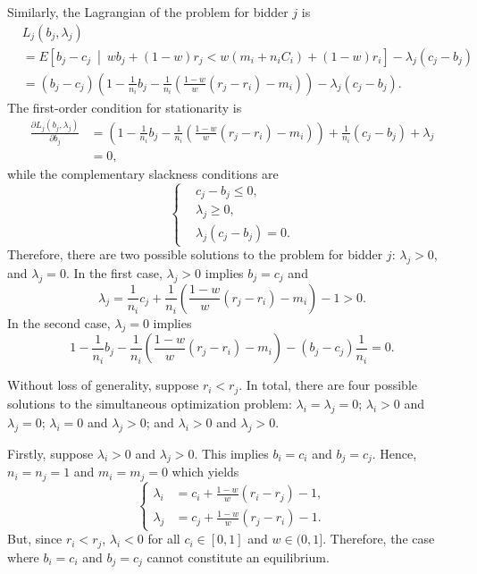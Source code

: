 Similarly, the Lagrangian of the problem for bidder $j$ is 
\begin{align}
	&L_j(b_j,\lambda_j) \nonumber\\
	&= E \left[ b_j-c_j \:\middle\vert\: wb_j + (1-w)r_j < w(m_i + n_i C_i) + (1-w)r_i\right] - \lambda_j(c_j-b_j) \nonumber\\
	&= (b_j-c_j)\left(1-\frac{1}{n_i}b_j - \frac{1}{n_i}\left(\frac{1-w}{w}(r_j-r_i)-m_i\right)\right) - \lambda_j(c_j-b_j).
	\label{eq:pcomp_langrangean_bidder_j}
\end{align}
The first-order condition for stationarity is
\begin{align*}
	\frac{\partial L_j(b_j,\lambda_j)}{\partial b_j} &= \left( 1 - \frac{1}{n_i}b_j - \frac{1}{n_i}\left( \frac{1-w}{w}(r_j-r_i)-m_i \right) \right) + \frac{1}{n_i}\left(c_j-b_j\right) + \lambda_j\nonumber\\
	&=0,	
\end{align*}
while the complementary slackness conditions are
\begin{equation*}
	\left\{
	\begin{array}{ll}
		&c_j-b_j\le 0,\\
		&\lambda_j\ge 0,\\
		&\lambda_j(c_j-b_j) = 0.
	\end{array}
	\right.	
\end{equation*}
Therefore, there are two possible solutions to the problem for bidder $j$: $\lambda_j > 0$, and $\lambda_j=0$. In the first case, $\lambda_j > 0$ implies $b_j=c_j$ and
\begin{equation*}
	\lambda_j = \frac{1}{n_i}c_j + \frac{1}{n_i}\left( \frac{1-w}{w}(r_j-r_i) - m_i \right) - 1 > 0.
\end{equation*}
In the second case, $\lambda_j=0$ implies
\begin{equation*}
	1 - \frac{1}{n_i}b_j - \frac{1}{n_i}\left( \frac{1-w}{w}(r_j-r_i) - m_i \right) - (b_j-c_j)\frac{1}{n_i} = 0.
\end{equation*}

Without loss of generality, suppose $r_i<r_j$. In total, there are four possible solutions to the simultaneous optimization problem: $\lambda_i=\lambda_j=0$; $\lambda_i > 0$ and $\lambda_j=0$; $\lambda_i=0$ and $\lambda_j > 0$; and $\lambda_i > 0$ and $\lambda_j > 0$.

Firstly, suppose $\lambda_i > 0$ and $\lambda_j > 0$. This implies $b_i=c_i$ and $b_j=c_j$. Hence, $n_i=n_j=1$ and $m_i=m_j=0$ which yields
\begin{equation*}
	\left\{
	\begin{array}{ll}
		\lambda_i &= c_i + \displaystyle\frac{1-w}{w}(r_i-r_j)-1,\\[2ex]
		\lambda_j &= c_j + \displaystyle\frac{1-w}{w}(r_j-r_i)-1.
	\end{array}
	\right.
\end{equation*}
But, since $r_i < r_j$, $\lambda_i < 0$ for all $c_i\in[0,1]$ and $w\in(0,1]$. Therefore, the case where $b_i=c_i$ and $b_j=c_j$ cannot constitute an equilibrium.

